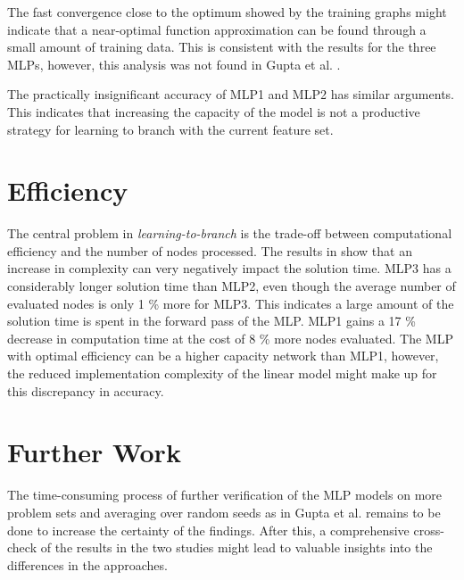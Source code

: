 The fast convergence close to the optimum showed by the training graphs might indicate that a near-optimal function approximation can be found through a small amount of training data. This is consistent with the results for the three MLPs, however, this analysis was not found in Gupta et al. \cite{gupta2020hybrid}.

The practically insignificant accuracy of MLP1 and MLP2 has similar arguments. This indicates that increasing the capacity of the model is not a productive strategy for learning to branch with the current feature set. 

\section{Efficiency}

The central problem in \textit{learning-to-branch} is the trade-off between computational efficiency and the number of nodes processed. The results in  show that an increase in complexity can very negatively impact the solution time. MLP3 has a considerably longer solution time than MLP2, even though the average  number of evaluated nodes is only 1 \% more for MLP3. This indicates a large amount of the solution time is spent in the forward pass of the MLP. MLP1 gains a 17 \% decrease in computation time at the cost of 8 \% more nodes evaluated. The \gls{MLP} with optimal efficiency can be a higher capacity network than MLP1, however, the reduced implementation complexity of the linear model might make up for this discrepancy in accuracy. 



\section{Further Work}

The time-consuming process of further verification of the \gls{MLP} models on more problem sets and averaging over random seeds as in Gupta et al. \cite{gupta2020hybrid} remains to be done to increase the certainty of the findings. After this, a comprehensive cross-check of the results in the two studies might lead to valuable insights into the differences in the approaches.   

